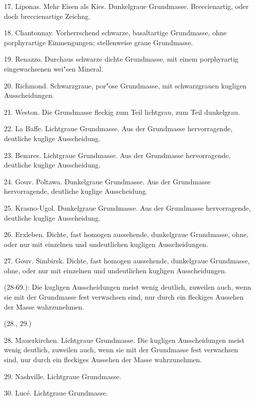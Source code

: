 \documentclass[a4paper, 11pt, oneside, polutonikogreek, german]{article}
\begin{document}
17. Liponas. Mehr Eisen als Kies. Dunkelgraue Grundmasse. Breccienartig, oder doch breccienartige Zeichng.

18. Chantonnay. Vorherrschend schwarze, basaltartige Grundmasse, ohne porphyrartige Einmengungen; stellenweise graue Grundmasse.

19. Renazzo. Durchaus schwarze dichte Grundmasse, mit einem porphyrartig eingewachsenen wei"sen Mineral.

20. Richmond. Schwarzgraue, por"ose Grundmasse, mit schwarzgrauen kugligen Ausscheidungen.

21. Weston. Die Grundmasse fleckig zum Teil lichtgrau, zum Teil dunkelgrau.

22. La Baffe. Lichtgraue Grundmasse. Aus der Grundmasse hervorragende, deutliche kuglige Ausscheidung.

23. Benares. Lichtgraue Grundmasse. Aus der Grundmasse hervorragende, deutliche kuglige Ausscheidung.

24. Gouv. Poltawa. Dunkelgraue Grundmasse. Aus der Grundmasse hervorragende, deutliche kuglige Ausscheidung. 

25. Krasno-Ugol. Dunkelgraue Grundmasse. Aus der Grundmasse hervorragende, deutliche kuglige Ausscheidung.

26. Erxleben. Dichte, fast homogen aussehende, dunkelgraue Grundmasse, ohne, oder nur mit einzelnen und undeutlichen kugligen Ausscheidungen.

27. Gouv. Simbirsk. Dichte, fast homogen aussehende, dunkelgraue Grundmasse, ohne, oder nur mit einzelnen und undeutlichen kugligen Ausscheidungen.

\vspace{2ex}

(28-69.): Die kugligen Ausscheidungen meist wenig deutlich, zuweilen auch, wenn sie mit der Grundmasse fest verwachsen sind, nur durch ein fleckiges Aussehen der Masse wahrzunehmen.
\begin{center}
(28., 29.)
\end{center}
\hspace*{6mm}28. Mauerkirchen. Lichtgraue Grundmasse. Die kugligen Ausscheidungen meist wenig deutlich, zuweilen auch, wenn sie mit der Grundmasse fest verwachsen sind, nur durch ein fleckiges Aussehen der Masse wahrzunehmen.

29. Nashville. Lichtgraue Grundmasse.

\vspace{2ex}

30. Lucé. Lichtgraue Grundmasse.
\end{document}
